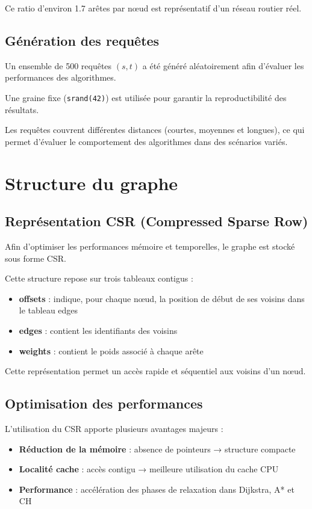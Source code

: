 \documentclass[11pt]{article}
\begin{document}
Ce ratio d’environ 1.7 arêtes par nœud est représentatif d’un réseau routier réel.

\subsection{Génération des requêtes}

Un ensemble de 500 requêtes $(s,t)$ a été généré aléatoirement afin d’évaluer les performances des algorithmes.

Une graine fixe (\texttt{srand(42)}) est utilisée pour garantir la reproductibilité des résultats.

Les requêtes couvrent différentes distances (courtes, moyennes et longues), ce qui permet d’évaluer le comportement des algorithmes dans des scénarios variés.
\section{Structure du graphe}

\subsection{Représentation CSR (Compressed Sparse Row)}

Afin d’optimiser les performances mémoire et temporelles, le graphe est stocké sous forme CSR.

Cette structure repose sur trois tableaux contigus :

\begin{itemize}
\item \textbf{offsets} : indique, pour chaque nœud, la position de début de ses voisins dans le tableau edges
\item \textbf{edges} : contient les identifiants des voisins
\item \textbf{weights} : contient le poids associé à chaque arête
\end{itemize}

Cette représentation permet un accès rapide et séquentiel aux voisins d’un nœud.

\subsection{Optimisation des performances}

L’utilisation du CSR apporte plusieurs avantages majeurs :

\begin{itemize}
\item \textbf{Réduction de la mémoire} : absence de pointeurs → structure compacte
\item \textbf{Localité cache} : accès contigu → meilleure utilisation du cache CPU
\item \textbf{Performance} : accélération des phases de relaxation dans Dijkstra, A* et CH
\end{itemize}
\end{document}
